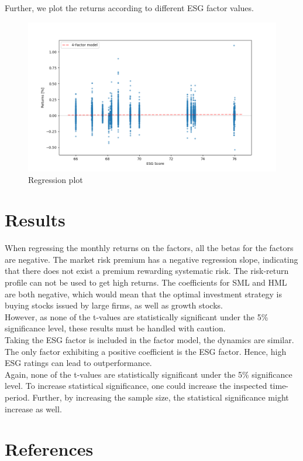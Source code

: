 \documentclass[12pt, a4paper]{article}%
\begin{document}
Further, we plot the returns according to different ESG factor values.\\ %

\begin{figure}
    \centering
    \includegraphics[width=\textwidth]{../figures/regression.png}
    \caption{Regression plot}
    \label{fig:regression}
  \end{figure}

\section{Results} 
When regressing the monthly returns on the \textcite{FamaFrench1992} factors, all the betas for the factors are negative. The market risk premium has a negative regression slope, indicating that there does not exist a premium rewarding systematic risk. The risk-return profile can not be used to get high returns.
The coefficients for SML and HML are both negative, which would mean that the optimal investment strategy is buying stocks issued by large firms, as well as growth stocks.\\
However, as none of the t-values are statistically significant under the 5\% significance level, these results must be handled with caution.\\

Taking the ESG factor is included in the factor model, the dynamics are similar. The only factor exhibiting a positive coefficient is the ESG factor. Hence, high ESG ratings can lead to outperformance.\\
Again, none of the t-values are statistically significant under the 5\% significance level.
To increase statistical significance, one could increase the inspected time-period. Further, by increasing the sample size, the statistical significance might increase as well.


\section{References}
\printbibliography[heading=none]
\end{document}
